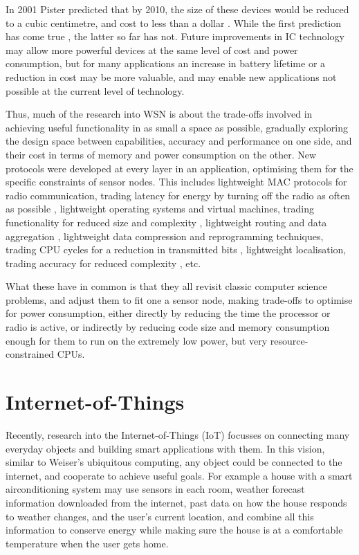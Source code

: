 In 2001 Pister predicted that by 2010, the size of these devices would be reduced to a cubic centimetre, and cost to less than a dollar \cite{Pister:2001vr}. While the first prediction has come true \cite{Wang:2014cq}, the latter so far has not. Future improvements in IC technology may allow more powerful devices at the same level of cost and power consumption, but for many applications an increase in battery lifetime or a reduction in cost may be more valuable, and may enable new applications not possible at the current level of technology.

Thus, much of the research into WSN is about the trade-offs involved in achieving useful functionality in as small a space as possible, gradually exploring the design space between capabilities, accuracy and performance on one side, and their cost in terms of memory and power consumption on the other. New protocols were developed at every layer in an application, optimising them for the specific constraints of sensor nodes. This includes lightweight MAC protocols for radio communication, trading latency for energy by turning off the radio as often as possible \cite{Ye:2002uv, vanDam:2018tr}, lightweight operating systems and virtual machines, trading functionality for reduced size and complexity \cite{Levis:2004ws, Gu:2006ww, Han:2005th, Levis:2002ku, Brouwers:2009cj}, lightweight routing and data aggregation \cite{Intanogonwiwat:2018wz, Braginsky:2002wg}, lightweight data compression and reprogramming techniques, trading CPU cycles for a reduction in transmitted bits \cite{Marcelloni:2009ja, Reijers:2003ww}, lightweight localisation, trading accuracy for reduced complexity \cite{Niculescu:2001bl, Savarese:2002tx, Savvides:2002uf}, etc.

What these have in common is that they all revisit classic computer science problems, and adjust them to fit one a sensor node, making trade-offs to optimise for power consumption, either directly by reducing the time the processor or radio is active, or indirectly by reducing code size and memory consumption enough for them to run on the extremely low power, but very resource-constrained CPUs.

\section{Internet-of-Things}
\label{sec-introduction-iot}
Recently, research into the Internet-of-Things (IoT) focusses on connecting many everyday objects and building smart applications with them. In this vision, similar to Weiser's ubiquitous computing, any object could be connected to the internet, and cooperate to achieve useful goals. For example a house with a smart airconditioning system may use sensors in each room, weather forecast information downloaded from the internet, past data on how the house responds to weather changes, and the user's current location, and combine all this information to conserve energy while making sure the house is at a comfortable temperature when the user gets home.

